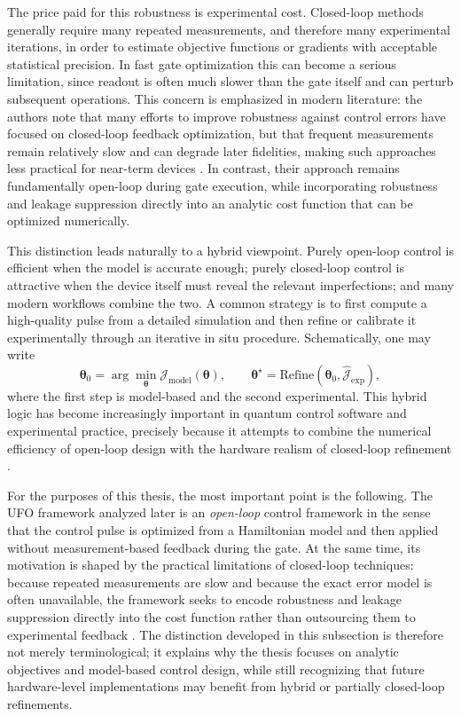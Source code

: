 The price paid for this robustness is experimental cost. Closed-loop methods generally require many repeated measurements, and therefore many experimental iterations, in order to estimate objective functions or gradients with acceptable statistical precision. In fast gate optimization this can become a serious limitation, since readout is often much slower than the gate itself and can perturb subsequent operations. This concern  is emphasized in modern literature: the authors note that many efforts to improve robustness against control errors have focused on closed-loop feedback optimization, but that frequent measurements remain relatively slow and can degrade later fidelities, making such approaches less practical for near-term devices \cite{Niu2019}. In contrast, their approach remains fundamentally open-loop during gate execution, while incorporating robustness and leakage suppression directly into an analytic cost function that can be optimized numerically.

This distinction leads naturally to a hybrid viewpoint. Purely open-loop control is efficient when the model is accurate enough; purely closed-loop control is attractive when the device itself must reveal the relevant imperfections; and many modern workflows combine the two. A common strategy is to first compute a high-quality pulse from a detailed simulation and then refine or calibrate it experimentally through an iterative in situ procedure. Schematically, one may write
\begin{equation}
\bm{\theta}_{0}
=
\arg\min_{\bm{\theta}} \mathcal{J}_{\mathrm{model}}(\bm{\theta}),
\qquad
\bm{\theta}^{\star}
=
\mathrm{Refine}\!\left(
\bm{\theta}_{0},
\widehat{\mathcal{J}}_{\mathrm{exp}}
\right),
\label{eq:hybrid_open_closed_workflow}
\end{equation}
where the first step is model-based and the second experimental. This hybrid logic has become increasingly important in quantum control software and experimental practice, precisely because it attempts to combine the numerical efficiency of open-loop design with the hardware realism of closed-loop refinement \cite{Koch2022,Rossignolo2023}.

For the purposes of this thesis, the most important point is the following. The UFO framework analyzed later is an \emph{open-loop} control framework in the sense that the control pulse is optimized from a Hamiltonian model and then applied without measurement-based feedback during the gate. At the same time, its motivation is shaped by the practical limitations of closed-loop techniques: because repeated measurements are slow and because the exact error model is often unavailable, the framework seeks to encode robustness and leakage suppression directly into the cost function rather than outsourcing them to experimental feedback \cite{Niu2019}. The distinction developed in this subsection is therefore not merely terminological; it explains why the thesis focuses on analytic objectives and model-based control design, while still recognizing that future hardware-level implementations may benefit from hybrid or partially closed-loop refinements.



